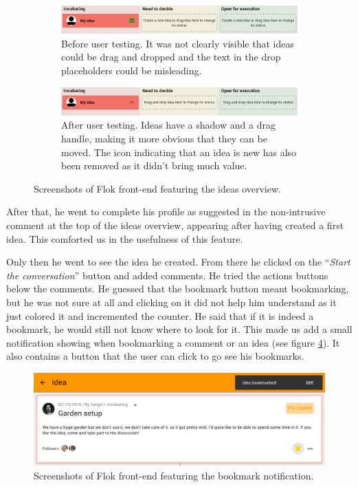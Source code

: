 \documentclass[a4paper,12pt, oneside]{article}
\begin{document}
\begin{figure}[!htb]
    \begin{subfigure}[t]{\textwidth}
        \includegraphics[width=\textwidth]{images/user_tests/ideasOverview_before.png}
        \caption{Before user testing. It was not clearly visible that ideas could be drag and dropped and the text in the drop placeholders could be misleading.}
        \label{fig.tests.ideasOverview.before}
    \end{subfigure}
    \begin{subfigure}[t]{\textwidth}
        \includegraphics[width=\textwidth]{images/user_tests/ideasOverview_after.png}
        \caption{After user testing. Ideas have a shadow and a drag handle, making it more obvious that they can be moved. The icon indicating that an idea is new has also been removed as it didn't bring much value.}
        \label{fig.tests.ideasOverview.after}
    \end{subfigure}
    \caption{Screenshots of Flok front-end featuring the ideas overview.}
    \label{fig.tests.ideasOverview}
\end{figure}

After that, he went to complete his profile as suggested in the non-intrusive comment at the top of the ideas overview, appearing after having created a first idea.
This comforted us in the usefulness of this feature.

Only then he went to see the idea he created.
From there he clicked on the “\emph{Start the conversation}” button and added comments.
He tried the actions buttons below the comments.
He guessed that the bookmark button meant bookmarking, but he was not sure at all and clicking on it did not help him understand as it just colored it and incremented the counter.
He said that if it is indeed a bookmark, he would still not know where to look for it.
This made us add a small notification showing when bookmarking a comment or an idea (see figure \ref{fig.tests.bookmarkNotification}).
It also contains a button that the user can click to go see his bookmarks.

\begin{figure}[!htb]
    \centering
    \includegraphics[width=\textwidth]{images/user_tests/bookmarkNotification.png}
    \caption{Screenshots of Flok front-end featuring the bookmark notification.}
    \label{fig.tests.bookmarkNotification}
\end{figure}
\end{document}
